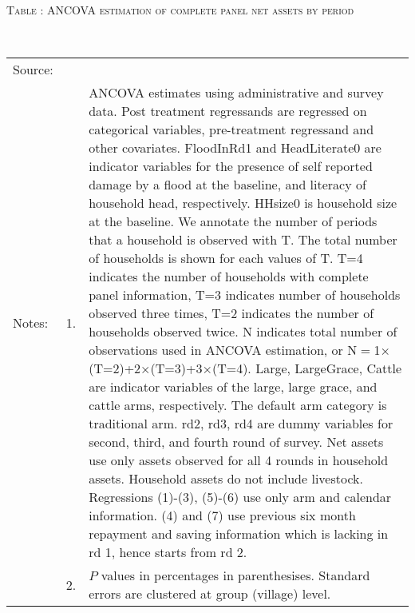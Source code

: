 \hspace{-1cm}\begin{minipage}[t]{14cm}
\hfil\textsc{\normalsize Table \thetable: ANCOVA estimation of complete panel net assets by period\label{tab ANCOVA narrow complete panel net assets timevarying}}\\
\setlength{\tabcolsep}{1pt}
\setlength{\baselineskip}{8pt}
\renewcommand{\arraystretch}{.55}
\hfil{}\\
\renewcommand{\arraystretch}{.8}
\setlength{\tabcolsep}{1pt}
\begin{tabular}{>{\hfill\scriptsize}p{1cm}<{}>{\hfill\scriptsize}p{.25cm}<{}>{\scriptsize}p{12cm}<{\hfill}}
Source:& \multicolumn{2}{l}{\scriptsize Estimated with GUK administrative and survey data.}\\
Notes: & 1. & ANCOVA estimates using administrative and survey data. Post treatment regressands are regressed on categorical variables, pre-treatment regressand and other covariates. \textsf{FloodInRd1} and \textsf{HeadLiterate0} are indicator variables for the presence of self reported damage by a flood at the baseline, and literacy of household head, respectively. \textsf{HHsize0} is household size at the baseline. We annotate the number of periods that a household is observed with \textsf{T}. The total number of households is shown for each values of \textsf{T}. \textsf{T=4} indicates the number of households with complete panel information, \textsf{T=3} indicates number of households observed three times, \textsf{T=2} indicates the number of households observed twice. \textsf{N} indicates total number of observations used in ANCOVA estimation, or \textsf{N$=$1$\times$(T=2)+2$\times$(T=3)+3$\times$(T=4)}.  \textsf{Large}, \textsf{LargeGrace}, \textsf{Cattle} are indicator variables of the \textsf{large}, \textsf{large grace}, and \textsf{cattle} arms, respectively. The default arm category is \textsf{traditional} arm. \textsf{rd2, rd3, rd4} are dummy variables for second, third, and fourth round of survey. Net assets use only assets observed for all 4 rounds in household assets. Household assets do not include livestock. Regressions (1)-(3), (5)-(6) use only arm and calendar information. (4) and (7) use previous six month repayment and saving information which is lacking in rd 1, hence starts from rd 2.\\
& 2. & $P$ values in percentages in parenthesises. Standard errors are clustered at group (village) level.
\end{tabular}
\end{minipage}

